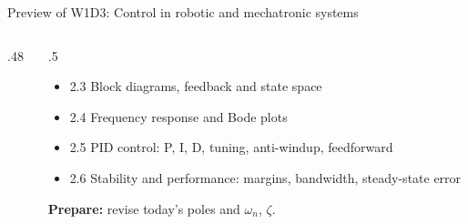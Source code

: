 \documentclass[aspectratio=169,10pt]{beamer}
\begin{document}
\begin{frame}{Preview of W1D3: Control in robotic and mechatronic systems}
\begin{columns}[T]
\begin{column}{.48\textwidth}
\centering
{}
\end{column}
\begin{column}{.5\textwidth}
\small
\begin{itemize}\setlength\itemsep{3pt}
\item 2.3 Block diagrams, feedback and state space
\item 2.4 Frequency response and Bode plots
\item 2.5 PID control: P, I, D, tuning, anti-windup, feedforward
\item 2.6 Stability and performance: margins, bandwidth, steady-state error
\end{itemize}
{\small \textbf{Prepare:} revise today's poles and $\omega_n$, $\zeta$.}
\end{column}
\end{columns}
\end{frame}
\end{document}

